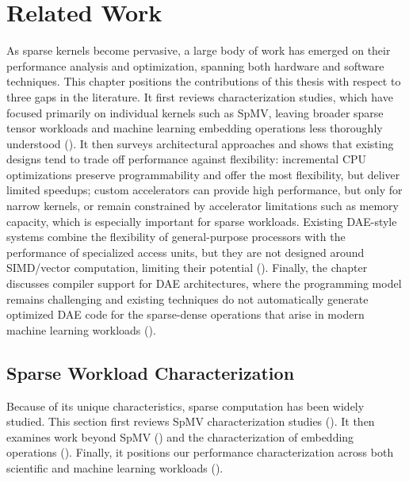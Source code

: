 \chapter{Related Work} \label{sec:related-work}

As sparse kernels become pervasive, a large body of work has emerged on their performance analysis and optimization, spanning both hardware and software techniques. This chapter positions the contributions of this thesis with respect to three gaps in the literature. It first reviews characterization studies, which have focused primarily on individual kernels such as SpMV, leaving broader sparse tensor workloads and machine learning embedding operations less thoroughly understood (). It then surveys architectural approaches and shows that existing designs tend to trade off performance against flexibility: incremental CPU optimizations preserve programmability and offer the most flexibility, but deliver limited speedups; custom accelerators can provide high performance, but only for narrow kernels, or remain constrained by accelerator limitations such as memory capacity, which is especially important for sparse workloads. Existing DAE-style systems combine the flexibility of general-purpose processors with the performance of specialized access units, but they are not designed around SIMD/vector computation, limiting their potential (). Finally, the chapter discusses compiler support for DAE architectures, where the programming model remains challenging and existing techniques do not automatically generate optimized DAE code for the sparse-dense operations that arise in modern machine learning workloads ().

\section{Sparse Workload Characterization} \label{sec:related-work-sparse-workload-characterization}

Because of its unique characteristics, sparse computation has been widely studied. This section first reviews SpMV characterization studies (). It then examines work beyond SpMV () and the characterization of embedding operations (). Finally, it positions our performance characterization across both scientific and machine learning workloads ().

